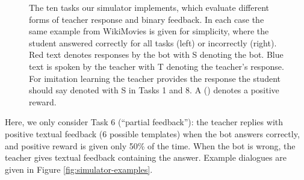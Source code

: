 \begin{figure}[!ht]
\begin{tabular}{|l|l|l|}
\end{tabular}
\caption[The ten tasks the simulator implements.]{The ten tasks our simulator implements, which evaluate different
forms of teacher response and binary feedback.
In each case the same example from WikiMovies is given for simplicity,
where the student answered correctly for all tasks (left) or incorrectly (right).
 {\color{red}Red} text denotes responses by the bot with  {\color{red}S} denoting the bot.
{\color{blue}Blue} text is spoken by the teacher with {\color{blue}T} denoting the teacher's response. For imitation learning the teacher provides the response the student should say denoted with {\color{blue}S} in Tasks 1 and 8.
A {(\color{blue}{+})} denotes a positive reward.
}
\label{Tasks}
\end{figure}




Here, we only consider %
 Task 6 (``partial feedback''): %
the teacher replies with positive textual feedback (6 possible templates) when the bot answers correctly, and positive reward is given only 50\% of the time.
When the bot is wrong, the teacher gives textual feedback containing the answer.
Example dialogues are given in Figure \ref{fig:simulator-examples}.


